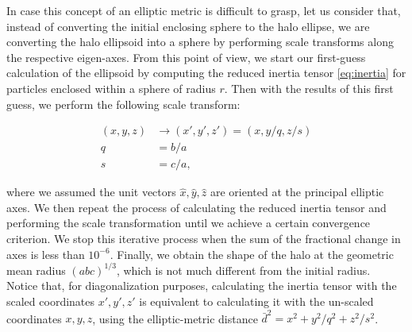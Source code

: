 In case this concept of an elliptic metric is difficult to grasp, let us consider that, instead of converting the initial enclosing sphere to the halo ellipse, we are converting the halo ellipsoid into a sphere by performing scale transforms along the respective eigen-axes. From this point of view, we start our first-guess calculation of the ellipsoid by computing the reduced inertia tensor \eqref{eq:inertia} for particles enclosed within a sphere of radius $r$. Then with the results of this first guess, we perform the following scale transform:
  
\begin{align}
(x,y,z) &\rightarrow (x',y',z')=(x,y/q,z/s) \label{eq:scale}\\
q &=  b/a \nonumber \\
s &= c/a \nonumber ,
\end{align}

where we assumed the unit vectors $\hat{x},\hat{y},\hat{z}$ are oriented at the principal elliptic axes. We then repeat the process of calculating the reduced inertia tensor and performing the scale transformation until we achieve a certain convergence criterion. We stop this iterative process when the sum of the fractional change in axes is less than $10^{-6}$. Finally, we obtain the shape of the halo at the geometric mean radius $(abc)^{1/3}$, which is not much different from the initial radius.\\

Notice that, for diagonalization purposes, calculating the inertia tensor with the scaled coordinates $x',y',z'$ is equivalent to calculating it with the un-scaled coordinates $x,y,z$, using the elliptic-metric distance $\bar{d}^2 = x^2+y^2/q^2+z^2/s^2$.\\







